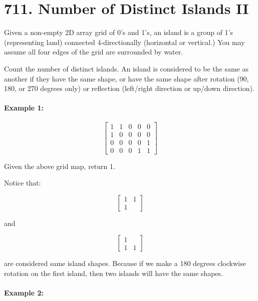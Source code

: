 \section{711. Number of Distinct Islands II}
Given a non-empty 2D array grid of 0's and 1's, an island is a group of 1's (representing land) connected 4-directionally (horizontal or vertical.) You may assume all four edges of the grid are surrounded by water.

Count the number of distinct islands. An island is considered to be the same as another if they have the same shape, or have the same shape after rotation (90, 180, or 270 degrees only) or reflection (left/right direction or up/down direction).

\paragraph{Example 1:}

\begin{flushleft}

\[
\begin{bmatrix}
1 & 1 & 0 & 0 & 0\\
1 & 0 & 0 & 0 & 0\\
0 & 0 & 0 & 0 & 1\\
0 & 0 & 0 & 1 & 1
\end{bmatrix}
\]


Given the above grid map, return 1.

Notice that:

\[
\begin{bmatrix}
1 & 1 \\
1 &
\end{bmatrix}
\]

and

\[
\begin{bmatrix}
1 & \\
1 & 1
\end{bmatrix}
\]

are considered same island shapes. Because if we make a 180 degrees clockwise rotation on the first island, then two islands will have the same shapes.



\end{flushleft}

\paragraph{Example 2:}

